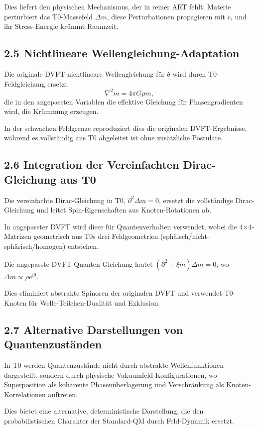 	Dies liefert den physischen Mechanismus, der in reiner ART fehlt: Materie perturbiert das T0-Massefeld $\Delta m$, diese Perturbationen propagieren mit c, und ihr Stress-Energie krümmt Raumzeit.
	
	\subsection{2.5 Nichtlineare Wellengleichung-Adaptation}
	
	Die originale DVFT-nichtlineare Wellengleichung für $\theta$ wird durch T0-Feldgleichung ersetzt
	\[
	\nabla^2 m = 4\pi G \rho m,
	\]
	die in den angepassten Variablen die effektive Gleichung für Phasengradienten wird, die Krümmung erzeugen.
	
	In der schwachen Feldgrenze reproduziert dies die originalen DVFT-Ergebnisse, während es vollständig aus T0 abgeleitet ist ohne zusätzliche Postulate.
	
	\subsection{2.6 Integration der Vereinfachten Dirac-Gleichung aus T0}
	
	Die vereinfachte Dirac-Gleichung in T0, $\partial^2 \Delta m = 0$, ersetzt die vollständige Dirac-Gleichung und leitet Spin-Eigenschaften aus Knoten-Rotationen ab.
	
	In angepasster DVFT wird diese für Quantenverhalten verwendet, wobei die 4×4-Matrizen geometrisch aus T0s drei Feldgeometrien (sphäisch/nicht-sphärisch/homogen) entstehen.
	
	Die angepasste DVFT-Quanten-Gleichung lautet $(\partial^2 + \xi m) \Delta m = 0$, wo $\Delta m \propto \rho e^{i\theta}$.
	
	Dies eliminiert abstrakte Spinoren der originalen DVFT und verwendet T0-Knoten für Welle-Teilchen-Dualität und Exklusion.
	
	\subsection{2.7 Alternative Darstellungen von Quantenzuständen}
	
	In T0 werden Quantenzustände nicht durch abstrakte Wellenfunktionen dargestellt, sondern durch physische Vakuumfeld-Konfigurationen, wo Superposition als kohärente Phasenüberlagerung und Verschränkung als Knoten-Korrelationen auftreten.
	
	Dies bietet eine alternative, deterministische Darstellung, die den probabilistischen Charakter der Standard-QM durch Feld-Dynamik ersetzt.
	
